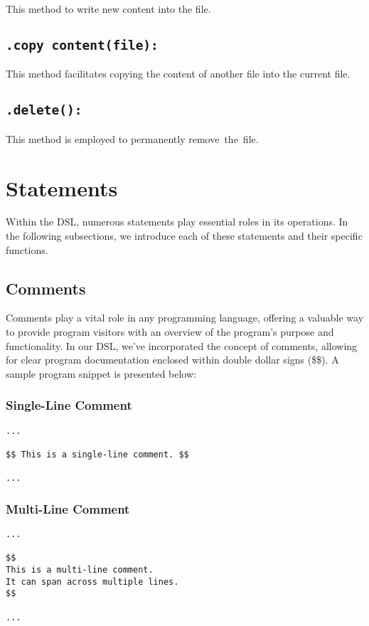 \documentclass{article}
\begin{document}
This method to write new content into the file.
\subsection{\texttt{.copy content(file):}}

This method facilitates copying the content of another file into the current file.
\subsection{\texttt{.delete():}}

This method is employed to permanently remove the file.

\section{Statements}
Within the DSL, numerous statements play essential roles in its operations. In the following subsections, we introduce each of these statements and their specific functions.

\subsection{Comments}
Comments play a vital role in any programming language, offering a valuable way to provide program visitors with an overview of the program's purpose and functionality. In our DSL, we've incorporated the concept of comments, allowing for clear program documentation enclosed within double dollar signs (\$\$). A sample program snippet is presented below:

\subsubsection{Single-Line Comment}
\begin{verbatim}
...

$$ This is a single-line comment. $$

...
\end{verbatim}

\subsubsection{Multi-Line Comment}
\begin{verbatim}
...

$$
This is a multi-line comment.
It can span across multiple lines.
$$

...
\end{verbatim}
\end{document}
